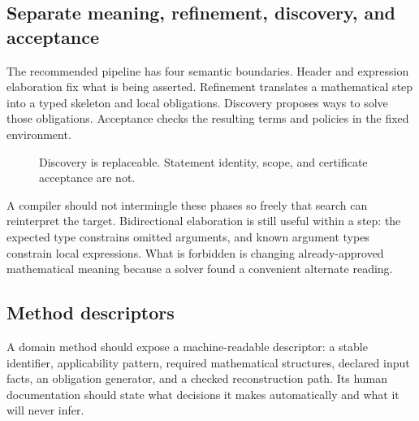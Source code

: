 \documentclass[11pt,letterpaper]{article}
\theoremstyle{definition}
\theoremstyle{remark}
\begin{document}
\subsection{Separate meaning, refinement, discovery, and acceptance}
The recommended pipeline has four semantic boundaries. Header and expression elaboration fix what is being asserted. Refinement translates a mathematical step into a typed skeleton and local obligations. Discovery proposes ways to solve those obligations. Acceptance checks the resulting terms and policies in the fixed environment.

\begin{figure}[htbp]
\centering
{}
\caption{Discovery is replaceable. Statement identity, scope, and certificate acceptance are not.}
\label{fig:pipeline}
\end{figure}

A compiler should not intermingle these phases so freely that search can reinterpret the target. Bidirectional elaboration is still useful within a step: the expected type constrains omitted arguments, and known argument types constrain local expressions. What is forbidden is changing already-approved mathematical meaning because a solver found a convenient alternate reading.

\subsection{Method descriptors}
A domain method should expose a machine-readable descriptor: a stable identifier, applicability pattern, required mathematical structures, declared input facts, an obligation generator, and a checked reconstruction path. Its human documentation should state what decisions it makes automatically and what it will never infer.
\end{document}
